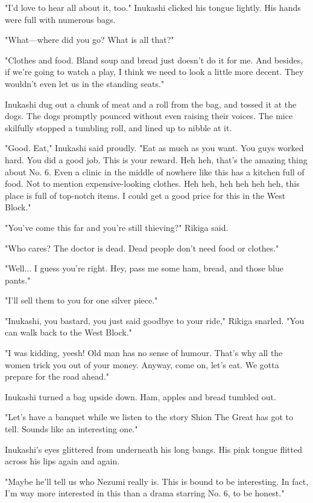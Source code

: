 "I'd love to hear all about it, too." Inukashi clicked his tongue
lightly. His hands were full with numerous bags.

"What---where did you go? What is all that?"

"Clothes and food. Bland soup and bread just doesn't do it for me. And
besides, if we're going to watch a play, I think we need to look a
little more decent. They wouldn't even let us in the standing seats."

Inukashi dug out a chunk of meat and a roll from the bag, and tossed it
at the dogs. The dogs promptly pounced without even raising their
voices. The mice skilfully stopped a tumbling roll, and lined up to
nibble at it.

"Good. Eat," Inukashi said proudly. "Eat as much as you want. You guys
worked hard. You did a good job. This is your reward. Heh heh, that's
the amazing thing about No. 6. Even a clinic in the middle of nowhere
like this has a kitchen full of food. Not to mention expensive-looking
clothes. Heh heh, heh heh heh heh, this place is full of top-notch
items. I could get a good price for this in the West Block."

"You've come this far and you're still thieving?" Rikiga said.

"Who cares? The doctor is dead. Dead people don't need food or clothes."

"Well... I guess you're right. Hey, pass me some ham, bread, and those
blue pants."

"I'll sell them to you for one silver piece."

"Inukashi, you bastard, you just said goodbye to your ride," Rikiga
snarled. "You can walk back to the West Block."

"I was kidding, yeesh! Old man has no sense of humour. That's why all
the women trick you out of your money. Anyway, come on, let's eat. We
gotta prepare for the road ahead."

Inukashi turned a bag upside down. Ham, apples and bread tumbled out.

"Let's have a banquet while we listen to the story Shion The Great has
got to tell. Sounds like an interesting one."

Inukashi's eyes glittered from underneath his long bangs. His pink
tongue flitted across his lips again and again.

"Maybe he'll tell us who Nezumi really is. This is bound to be
interesting. In fact, I'm way more interested in this than a drama
starring No. 6, to be honest."

